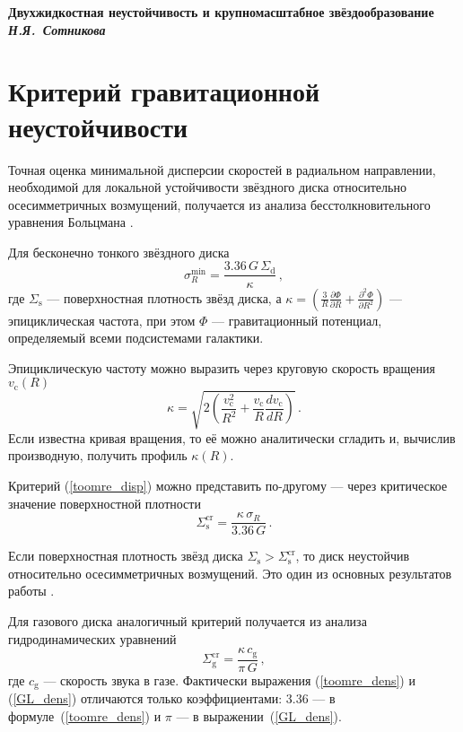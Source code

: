 \documentclass[russian,12pt]{article}
\def\noi{\noindent}
\def\bc{\begin{center}}
\def\ec{\end{center}}
\def\be{\begin{equation}}
\def\ee{\end{equation}}
\begin{document}
\bc
\Large\bf 
Двухжидкостная неустойчивость и крупномасштабное звёздообразование \\
\vspace{0.5cm}
{\it Н.Я.~Сотникова}
\ec

\section{Критерий гравитационной неустойчивости}

Точная оценка минимальной дисперсии скоростей в радиальном направлении, 
необходимой для локальной устойчивости звёздного диска относительно 
осесимметричных возмущений, получается из анализа бесстолкновительного 
уравнения Больцмана 
\citep{Toomre64}.

\noi
Для бесконечно тонкого звёздного диска
\be
\sigma_{R}^\mathrm{min} = \frac{3.36 \, G \, \Sigma_\mathrm{d}}{\kappa} \, ,
\label{toomre_disp}
\ee
где $\Sigma_\mathrm{s}$ --- поверхностная плотность звёзд диска, а 
$\displaystyle \kappa = 
\left( \frac{3}{R} \frac{\partial \Phi}{\partial R} + 
\frac{\partial^2 \Phi}{\partial R^2} \right) $ 
--- эпициклическая частота, при этом $\Phi$ 
--- гравитационный потенциал, определяемый всеми подсистемами 
галактики.

Эпициклическую частоту можно выразить через круговую скорость вращения 
$v_\mathrm{c}(R)$
$$
\displaystyle \kappa = 
\sqrt{2 \left(\frac{v_\mathrm{c}^2}{R^2} + 
\frac{v_\mathrm{c}}{R} \frac{d v_\mathrm{c}}{dR} \right)} \, .
$$
Если известна кривая вращения, то её можно аналитически сгладить и, 
вычислив производную, получить профиль $\kappa(R)$.

Критерий (\ref{toomre_disp}) можно представить по-другому --- через 
критическое значение поверхностной плотности
\be
\Sigma_\mathrm{s}^\mathrm{cr} = \frac{\kappa \, \sigma_R}{3.36 \, G} \, .
\label{toomre_dens}
\ee

\noi
Если поверхностная плотность звёзд диска 
$\Sigma_\mathrm{s} > \Sigma_\mathrm{s}^\mathrm{cr}$, то диск неустойчив 
относительно осесимметричных возмущений. Это один из основных 
результатов работы \cite{Toomre64}.

Для газового диска аналогичный критерий получается из анализа 
гидродинамических уравнений \citep{GL_B65}
\be
\Sigma_\mathrm{g}^\mathrm{cr} = \frac{\kappa \, c_\mathrm{g}}{\pi \, G} \, ,
\label{GL_dens}
\ee
где $c_\mathrm{g}$ --- скорость звука в газе. Фактически выражения 
(\ref{toomre_dens}) и (\ref{GL_dens}) отличаются только коэффициентами: 
3.36 --- в формуле~(\ref{toomre_dens}) и $\pi$ --- в выражении~(\ref{GL_dens}).
\end{document}
